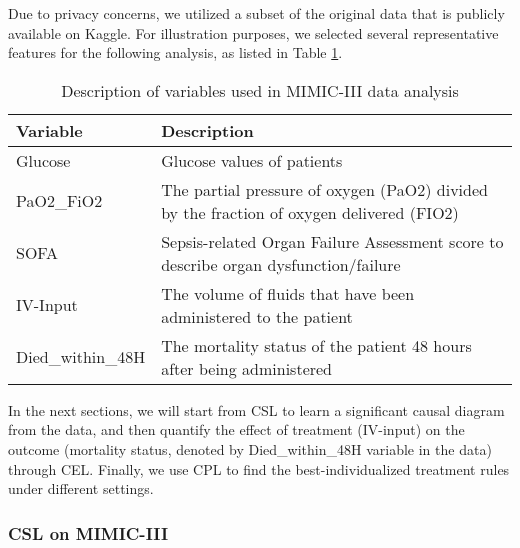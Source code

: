 Due to privacy concerns, we utilized a subset of the original data that is publicly available on Kaggle. For illustration purposes, we selected several representative features for the following analysis, as listed in Table \ref{table:MIMIC3}.
\begin{table}[ht]
\centering
\begin{tabular}{l|p{12cm}}
\hline
\textbf{Variable} & \textbf{Description} \\
\hline
Glucose & Glucose values of patients \\
PaO2\_FiO2 & The partial pressure of oxygen (PaO2) divided by the fraction of oxygen delivered (FIO2) \\
\acrshort{SOFA} & Sepsis-related Organ Failure Assessment score to describe organ dysfunction/failure \\
IV-Input & The volume of fluids that have been administered to the patient \\
Died\_within\_48H & The mortality status of the patient 48 hours after being administered \\
\hline
\end{tabular}
\caption{Description of variables used in \acrshort{MIMIC-III} data analysis}\label{table:MIMIC3}
\end{table}

In the next sections, we will start from \acrshort{CSL} to learn a significant causal diagram from the data, and then quantify the effect of treatment (IV-input) on the outcome (mortality status, denoted by Died\_within\_48H variable in the data) through \acrshort{CEL}. Finally, we use \acrshort{CPL} to find the best-individualized treatment rules under different settings.

\subsubsection{\acrshort{CSL} on \acrshort{MIMIC-III}}

